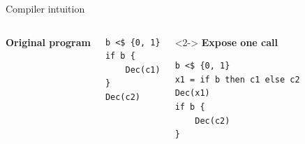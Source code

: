 \begin{frame}[fragile]{Compiler intuition}
  \lstset{basicstyle=\ttfamily\small,columns=fullflexible,
    keepspaces=true,showstringspaces=false}
  \begin{columns}[T,onlytextwidth]
      \textbf{Original program}\par
      \begin{lstlisting}
b <$ {0, 1}
if b {
    Dec(c1)
}
Dec(c2)
      \end{lstlisting}
      \begin{uncoverenv}<2->
      \textbf{Expose one call}\par
      \begin{lstlisting}
b <$ {0, 1}
x1 = if b then c1 else c2
Dec(x1)
if b {
    Dec(c2)
}
      \end{lstlisting}
      \end{uncoverenv}
  \end{columns}
\end{frame}

